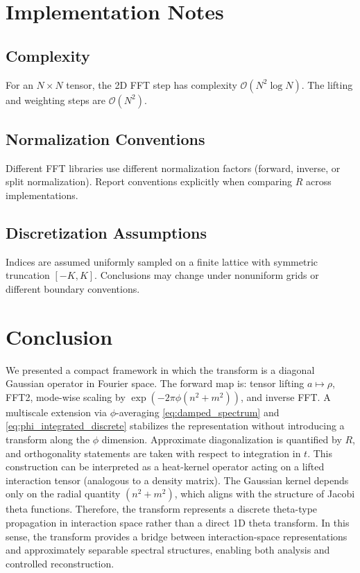 \documentclass[11pt]{article}
\begin{document}
\appendix
\section{Implementation Notes}
\subsection*{Complexity}
For an $N\times N$ tensor, the 2D FFT step has complexity $\mathcal{O}(N^2\log N)$. The lifting and weighting steps are $\mathcal{O}(N^2)$.

\subsection*{Normalization Conventions}
Different FFT libraries use different normalization factors (forward, inverse, or split normalization). Report conventions explicitly when comparing $R$ across implementations.

\subsection*{Discretization Assumptions}
Indices are assumed uniformly sampled on a finite lattice with symmetric truncation $[-K,K]$. Conclusions may change under nonuniform grids or different boundary conventions.

\section{Conclusion}
We presented a compact framework in which the transform is a diagonal Gaussian operator in Fourier space. The forward map is: tensor lifting $a\mapsto\rho$, FFT2, mode-wise scaling by $\exp(-2\pi\phi(n^2+m^2))$, and inverse FFT. A multiscale extension via $\phi$-averaging \eqref{eq:damped_spectrum} and \eqref{eq:phi_integrated_discrete} stabilizes the representation without introducing a transform along the $\phi$ dimension. Approximate diagonalization is quantified by $R$, and orthogonality statements are taken with respect to integration in $t$.
This construction can be interpreted as a heat-kernel operator acting on a lifted interaction tensor (analogous to a density matrix). The Gaussian kernel depends only on the radial quantity $(n^2+m^2)$, which aligns with the structure of Jacobi theta functions. Therefore, the transform represents a discrete theta-type propagation in interaction space rather than a direct 1D theta transform.
In this sense, the transform provides a bridge between interaction-space representations and approximately separable spectral structures, enabling both analysis and controlled reconstruction.
\end{document}

